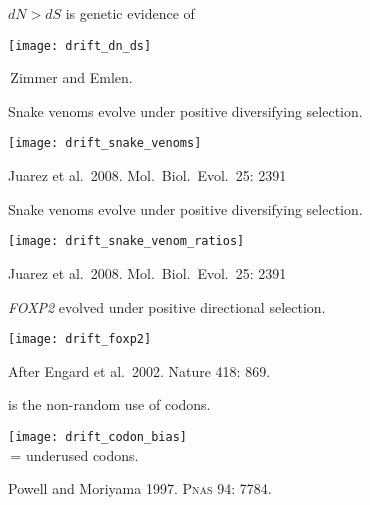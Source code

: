 \documentclass[t]{beamer}
\newcommand{\backskip}{\vspace{-0.5\baselineskip}}
\begin{document}

\begin{frame}{$dN > dS$ is genetic evidence of }

\backskip

\noindent \texttt{[image: drift\_dn\_ds]}

\vfilll

\tinyfill \textcopyright\,Zimmer and Emlen.

\end{frame}


\begin{frame}{Snake venoms evolve under positive diversifying selection.}

\backskip

\texttt{[image: drift\_snake\_venoms]}


\vfilll

\tiny Juarez et al.~2008. Mol.~Biol.~Evol.~25: 2391

\end{frame}


\begin{frame}{Snake venoms evolve under positive diversifying selection.}

\vspace{-\baselineskip}

\centering
\texttt{[image: drift\_snake\_venom\_ratios]}


\vfilll

\tinyfill Juarez et al.~2008. Mol.~Biol.~Evol.~25: 2391


\end{frame}


\begin{frame}{\textit{FOXP2} evolved under positive directional selection.}

\backskip

\centering

\texttt{[image: drift\_foxp2]}


\vfilll

\tinyfill After Engard et al.~2002. Nature 418: 869.

\end{frame}


\begin{frame}{ is the non-random use of codons.}
\backskip

\noindent \texttt{[image: drift\_codon\_bias]}\\
\raisebox{-0.7ex}{\Large *}\,= underused codons.

\vfilll

\tinyfill Powell and Moriyama 1997. P\textsc{nas} 94: 7784.
\end{frame}
\end{document}
